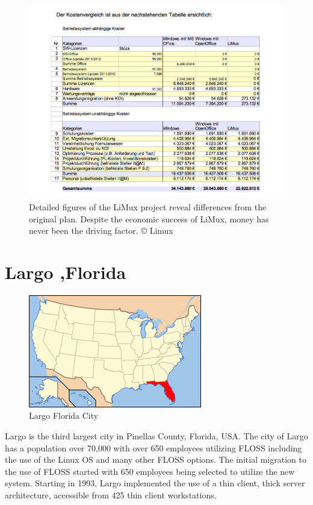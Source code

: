 \begin{figure}
\centering
    \includegraphics[scale=0.55]{img/limuxcost.png}
  \caption [Limux detailed cost]{Detailed figures of the LiMux project reveal differences from the original plan. Despite the economic success of LiMux, money has never been the driving factor. © Limux } 
\end{figure}
\section {Largo ,Florida}
\label{largo}
\begin{figure}[H]
\centering
    \includegraphics[scale=0.8]{img/Largo.png} 
  \caption{ Largo Florida City}
    \end{figure}
Largo is the third largest city in Pinellas County, Florida, USA.
The city of Largo has a population over 70,000 with over 650 employees utilizing FLOSS including the use of the Linux OS and many other FLOSS options. The initial migration to the use of FLOSS started with 650 employees being selected to utilize the new system. Starting in 1993, Largo implemented the use of a thin client, thick server architecture, accessible from 425 thin client workstations.

